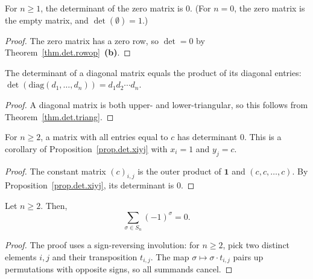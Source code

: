 \begin{lemma}
\label{lem.det.zero-eq-zero}
\leanhelper
\leanok
For $n \geq 1$, the determinant of the zero matrix is $0$.
(For $n = 0$, the zero matrix is the empty matrix, and $\det(\emptyset) = 1$.)
\end{lemma}

\begin{proof}
\leanok
The zero matrix has a zero row, so $\det = 0$ by
Theorem~\ref{thm.det.rowop}~\textbf{(b)}.
\end{proof}

\begin{lemma}
\label{lem.det.diagonal}
\leanhelper
\leanok
The determinant of a diagonal matrix equals the product of its diagonal entries:
$\det(\mathrm{diag}(d_1, \ldots, d_n)) = d_1 d_2 \cdots d_n$.
\end{lemma}

\begin{proof}
\leanok
A diagonal matrix is both upper- and lower-triangular, so this follows from
Theorem~\ref{thm.det.triang}.
\end{proof}

\begin{lemma}
\label{lem.det.const-matrix-zero}
\leanhelper
\leanok
For $n \geq 2$, a matrix with all entries equal to $c$ has determinant $0$.
This is a corollary of Proposition~\ref{prop.det.xiyj} with $x_i = 1$ and $y_j = c$.
\end{lemma}

\begin{proof}
\leanok
The constant matrix $(c)_{i,j}$ is the outer product of $\mathbf{1}$ and $(c, c, \ldots, c)$.
By Proposition~\ref{prop.det.xiyj}, its determinant is $0$.
\end{proof}

\begin{lemma}
\label{lem.det.sum-sign-zero}
\leanhelper
\leanok
Let $n \geq 2$. Then,
\[
  \sum_{\sigma \in S_n} (-1)^{\sigma} = 0.
\]
\end{lemma}

\begin{proof}
\leanok
The proof uses a sign-reversing involution: for $n \geq 2$, pick two distinct
elements $i, j$ and their transposition $t_{i,j}$. The map
$\sigma \mapsto \sigma \cdot t_{i,j}$ pairs up permutations with opposite signs,
so all summands cancel.
\end{proof}

